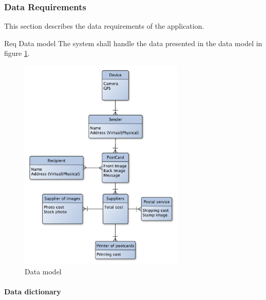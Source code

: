 \documentclass[10pt,a4paper]{article}
\begin{document}
	

\subsubsection{Data Requirements}
This section describes the data requirements of the application.


\begin {description}
	\item [Req \thesubsubsection {.\thedata} Data model] The system shall handle the data presented in the data model in figure \ref{fig:datamodel}.
\end{description}

\begin{figure}[h!]
\centering
\includegraphics[width=0.7\textwidth]{Data_figures/DataModel.pdf}
\caption{Data model}
\label{fig:datamodel}
\end{figure}
\FloatBarrier
\paragraph{Data dictionary}
\end{document}

